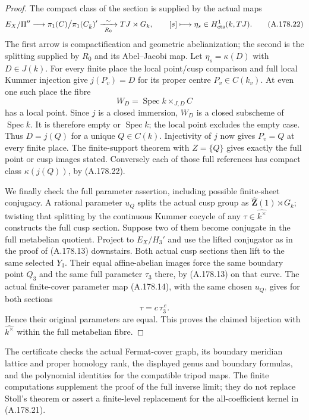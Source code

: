 \begin{proof}
The compact class of the section is supplied by the actual
maps
\[
 E_X/\Pi''\longrightarrow
 \pi_1(C)\big/\pi_1(C_{\bar k})'
       \xrightarrow[\ R_0\ ]{\ \sim\ }TJ\rtimes G_k,
 \qquad
                  [s]\longmapsto\eta_s\in H^1_{\rm cts}(k,TJ).
\tag{A.178.22}
\]
The first arrow is compactification and geometric
abelianization; the second is the splitting supplied by
\(R_0\) and its Abel--Jacobi map.  Let
\(\eta_s=\kappa(D)\) with \(D\in J(k)\).
For every finite place the local point/cusp comparison
and full local Kummer injection give
\(j(P_v)=D\) for its proper centre \(P_v\in C(k_v)\).
At even one such place the fibre
\[
                  W_D=\operatorname{Spec}k
                              \mathbin{\times}_{J,D}C
\tag{A.178.23}
\]
has a local point.  Since \(j\) is a closed immersion,
\(W_D\) is a closed subscheme of \(\operatorname{Spec}k\).
It is therefore empty or \(\operatorname{Spec}k\);
the local point excludes the empty case.
Thus \(D=j(Q)\) for a unique \(Q\in C(k)\).
Injectivity of \(j\) now gives \(P_v=Q\) at every
finite place.  The finite-support theorem with \(Z=\{Q\}\)
gives exactly the full point or cusp images stated.
Conversely each of those full references has compact
class \(\kappa(j(Q))\), by (A.178.22).

We finally check the full parameter assertion, including
possible finite-sheet conjugacy.  A rational parameter
\(u_Q\) splits the actual cusp group as
\(\widehat{\mathbf Z}(1)\rtimes G_k\); twisting that
splitting by the continuous Kummer cocycle of any
\(\tau\in\widehat{k^\times}\) constructs the full
cusp section.  Suppose two of them become conjugate
in the full metabelian quotient.  Project to
\(E_X/H_3'\) and use the lifted conjugator as in the
proof of (A.178.13) downstairs.  Both actual cusp
sections then lift to the same selected \(Y_3\).
Their equal affine-abelian images force the same
boundary point \(Q_3\) and the same full parameter
\(\tau_3\) there, by (A.178.13) on that curve.
The actual finite-cover parameter map (A.178.14), with
the same chosen \(u_Q\), gives for both sections
\[
                             \tau=c\,\tau_3^{\,e}.
\tag{A.178.24}
\]
Hence their original parameters are equal.
This proves the claimed bijection with
\(\widehat{k^\times}\) within the full metabelian fibre.
\end{proof}

The certificate
checks the actual Fermat-cover graph, its boundary meridian
lattice and proper homology rank, the displayed genus and
boundary formulas, and the polynomial identities for the
compatible tripod maps.  The finite computations supplement
the proof of the full inverse limit; they do not replace
Stoll's theorem or assert a finite-level replacement for the
all-coefficient kernel in (A.178.21).
